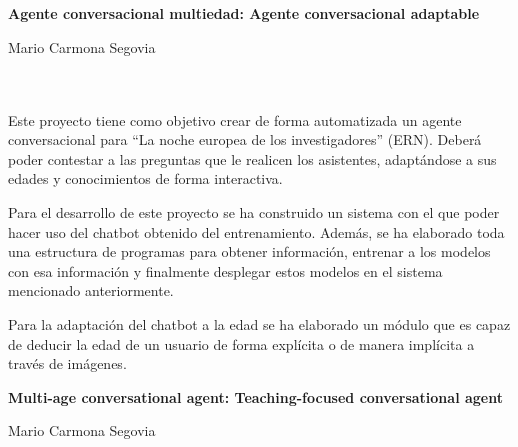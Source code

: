 \chapter*{}


\thispagestyle{empty}

\begin{center}
{\large\bfseries Agente conversacional multiedad: Agente conversacional adaptable}\\
\end{center}
\begin{center}
Mario Carmona Segovia\\
\end{center}

\\

\vspace{0.7cm}
\\

Este proyecto tiene como objetivo crear de forma automatizada un agente conversacional para ``La noche europea de los investigadores'' (ERN). Deberá poder contestar a las preguntas que le realicen los asistentes, adaptándose a sus edades y conocimientos de forma interactiva.

Para el desarrollo de este proyecto se ha construido un sistema con el que poder hacer uso del chatbot obtenido del entrenamiento. Además, se ha elaborado toda una estructura de programas para obtener información, entrenar a los modelos con esa información y finalmente desplegar estos modelos en el sistema mencionado anteriormente.

Para la adaptación del chatbot a la edad se ha elaborado un módulo que es capaz de deducir la edad de un usuario de forma explícita o de manera implícita a través de imágenes.
\cleardoublepage


\thispagestyle{empty}


\begin{center}
{\large\bfseries Multi-age conversational agent: Teaching-focused conversational agent}\\
\end{center}
\begin{center}
Mario Carmona Segovia\\
\end{center}

